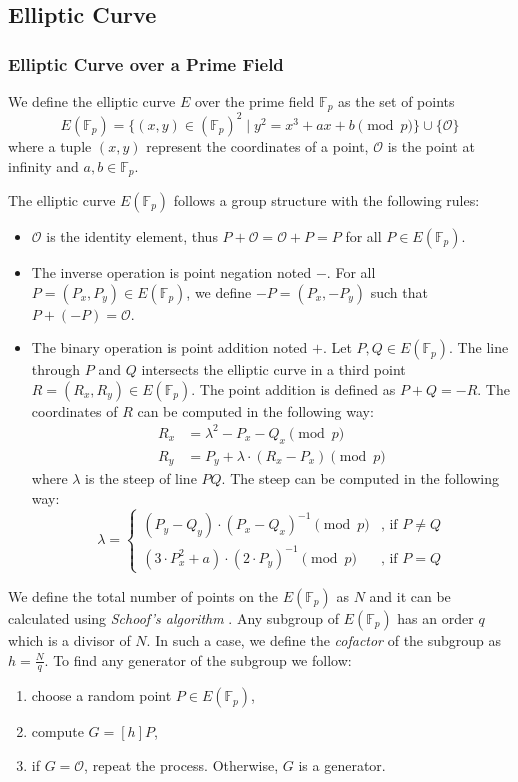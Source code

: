 \subsection{Elliptic Curve}


\subsubsection{Elliptic Curve over a Prime Field} \label{app: elliptic curve over a prime field}
We define the elliptic curve $E$ over the prime field $\mathbb{F}_p$ as the set of points
\[ E(\mathbb{F}_p) = \{ (x, y) \in (\mathbb{F}_p)^2 \mid y^2 = x^3 + ax + b \pmod p \} \cup \{ \mathcal{O} \} \]
where a tuple $(x, y)$ represent the coordinates of a point, $\mathcal{O}$ is the point at infinity and $a, b \in \mathbb{F}_p$.

The elliptic curve $E(\mathbb{F}_p)$ follows a group structure with the following rules:
\begin{itemize}
    \item $\mathcal{O}$ is the identity element, thus $P + \mathcal{O} = \mathcal{O} + P = P$ for all $P \in E(\mathbb{F}_p)$.
    \item The inverse operation is point negation noted $-$. For all $P = (P_x, P_y) \in E(\mathbb{F}_p)$, we define $-P = (P_x, -P_y)$ such that $P + (- P) = \mathcal{O}$.
    \item The binary operation is point addition noted $+$. Let $P, Q \in E(\mathbb{F}_p)$. The line through $P$ and $Q$ intersects the elliptic curve in a third point $R = (R_x, R_y) \in E(\mathbb{F}_p)$. The point addition is defined as $P + Q = -R$. The coordinates of $R$ can be computed in the following way:
    \begin{align*}
        R_x & = \lambda^2 - P_x - Q_x \pmod p \\
        R_y & = P_y + \lambda \cdot (R_x - P_x) \pmod p 
    \end{align*}
    where $\lambda$ is the steep of line $PQ$. The steep can be computed in the following way:
    \[ \lambda = 
    \begin{cases}
        (P_y - Q_y) \cdot (P_x - Q_x)^{-1} \pmod p  & \text{, if } P \neq Q \\
        (3 \cdot P_x^2 + a) \cdot (2 \cdot P_y)^{-1} \pmod{p} & \text{, if } P = Q
    \end{cases}
    \]
\end{itemize}

We define the total number of points on the $E(\mathbb{F}_p)$ as $N$ and it can be calculated using \textit{Schoof's algorithm} \cite{Schoof85}. Any subgroup of $E(\mathbb{F}_p)$ has an order $q$ which is a divisor of $N$. In such a case, we define the \textit{cofactor} of the subgroup as $h = \frac{N}{q}$. To find any generator of the subgroup we follow:
\begin{enumerate}
    \item choose a random point $P \in E(\mathbb{F}_p)$,
    \item compute $G = [h]P$,
    \item if $G = \mathcal{O}$, repeat the process. Otherwise, $G$ is a generator.
\end{enumerate}


